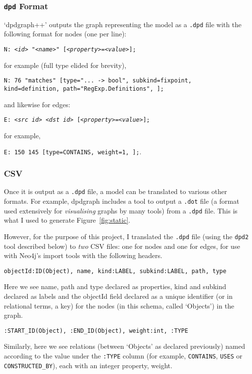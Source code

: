 \subsubsection{\texttt{dpd} Format}

`dpdgraph++' outputs the graph representing the model as a \texttt{.dpd} file
with the following format for nodes (one per line):

{\tt N: \emph{<id>} "\emph{<name>}" [\emph{<property>}=\emph{<value>}];}

for example (full type elided for brevity), 

{\tt N: 76 "matches" [type="... -> bool", subkind=fixpoint, kind=definition, path="RegExp.Definitions", ];}

and likewise for edges:

{\tt E: \emph{<src id>} \emph{<dst id>} [\emph{<property>}=\emph{<value>}];}

for example, 

{\tt E: 150 145 [type=CONTAINS, weight=1, ];}.

\subsubsection{CSV}\label{subsubsec:translationcsv}

Once it is output as a \texttt{.dpd} file, a model can be translated to various
other formats. For example, dpdgraph includes a tool to output a \texttt{.dot}
file (a format used extensively for \emph{visualising} graphs by many tools)
from a \texttt{.dpd} file. This is what I used to generate
Figure~\ref{fig:static}.

However, for the purpose of this project, I translated the \texttt{.dpd} file
(using the \texttt{dpd2} tool described below) to \emph{two} CSV files: one for
nodes and one for edges, for use with Neo4j's import tools with the following
headers.

\texttt{objectId:ID(Object), name, kind:LABEL, subkind:LABEL, path, type}

Here we see name, path and type declared as properties, kind and subkind
declared as labels and the objectId field declared as a unique identifier (or in
relational terms, a key) for the nodes (in this schema, called `Objects') in
the graph.

\texttt{:START\_ID(Object), :END\_ID(Object), weight:int, :TYPE}

Similarly, here we see relations (between `Objects' as declared
previously) named according to the value under the \texttt{:TYPE} column (for example,
\texttt{CONTAINS}, \texttt{USES} or \texttt{CONSTRUCTED\_BY}), each with an
integer property, weight.

